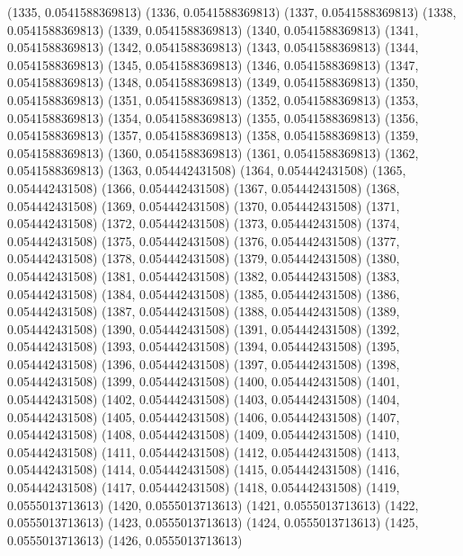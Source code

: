 {					(1335, 0.0541588369813)
					(1336, 0.0541588369813)
					(1337, 0.0541588369813)
					(1338, 0.0541588369813)
					(1339, 0.0541588369813)
					(1340, 0.0541588369813)
					(1341, 0.0541588369813)
					(1342, 0.0541588369813)
					(1343, 0.0541588369813)
					(1344, 0.0541588369813)
					(1345, 0.0541588369813)
					(1346, 0.0541588369813)
					(1347, 0.0541588369813)
					(1348, 0.0541588369813)
					(1349, 0.0541588369813)
					(1350, 0.0541588369813)
					(1351, 0.0541588369813)
					(1352, 0.0541588369813)
					(1353, 0.0541588369813)
					(1354, 0.0541588369813)
					(1355, 0.0541588369813)
					(1356, 0.0541588369813)
					(1357, 0.0541588369813)
					(1358, 0.0541588369813)
					(1359, 0.0541588369813)
					(1360, 0.0541588369813)
					(1361, 0.0541588369813)
					(1362, 0.0541588369813)
					(1363, 0.054442431508)
					(1364, 0.054442431508)
					(1365, 0.054442431508)
					(1366, 0.054442431508)
					(1367, 0.054442431508)
					(1368, 0.054442431508)
					(1369, 0.054442431508)
					(1370, 0.054442431508)
					(1371, 0.054442431508)
					(1372, 0.054442431508)
					(1373, 0.054442431508)
					(1374, 0.054442431508)
					(1375, 0.054442431508)
					(1376, 0.054442431508)
					(1377, 0.054442431508)
					(1378, 0.054442431508)
					(1379, 0.054442431508)
					(1380, 0.054442431508)
					(1381, 0.054442431508)
					(1382, 0.054442431508)
					(1383, 0.054442431508)
					(1384, 0.054442431508)
					(1385, 0.054442431508)
					(1386, 0.054442431508)
					(1387, 0.054442431508)
					(1388, 0.054442431508)
					(1389, 0.054442431508)
					(1390, 0.054442431508)
					(1391, 0.054442431508)
					(1392, 0.054442431508)
					(1393, 0.054442431508)
					(1394, 0.054442431508)
					(1395, 0.054442431508)
					(1396, 0.054442431508)
					(1397, 0.054442431508)
					(1398, 0.054442431508)
					(1399, 0.054442431508)
					(1400, 0.054442431508)
					(1401, 0.054442431508)
					(1402, 0.054442431508)
					(1403, 0.054442431508)
					(1404, 0.054442431508)
					(1405, 0.054442431508)
					(1406, 0.054442431508)
					(1407, 0.054442431508)
					(1408, 0.054442431508)
					(1409, 0.054442431508)
					(1410, 0.054442431508)
					(1411, 0.054442431508)
					(1412, 0.054442431508)
					(1413, 0.054442431508)
					(1414, 0.054442431508)
					(1415, 0.054442431508)
					(1416, 0.054442431508)
					(1417, 0.054442431508)
					(1418, 0.054442431508)
					(1419, 0.0555013713613)
					(1420, 0.0555013713613)
					(1421, 0.0555013713613)
					(1422, 0.0555013713613)
					(1423, 0.0555013713613)
					(1424, 0.0555013713613)
					(1425, 0.0555013713613)
					(1426, 0.0555013713613)
}
